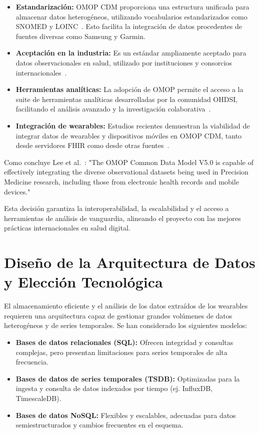 \begin{itemize}
    \item \textbf{Estandarización:} OMOP CDM proporciona una estructura unificada para almacenar datos heterogéneos, utilizando vocabularios estandarizados como SNOMED y LOINC~\cite{OHDSI}. Esto facilita la integración de datos procedentes de fuentes diversas como Samsung y Garmin.
    \item \textbf{Aceptación en la industria:} Es un estándar ampliamente aceptado para datos observacionales en salud, utilizado por instituciones y consorcios internacionales~\cite{Hripcsak2015}.
    \item \textbf{Herramientas analíticas:} La adopción de OMOP permite el acceso a la suite de herramientas analíticas desarrolladas por la comunidad OHDSI, facilitando el análisis avanzado y la investigación colaborativa~\cite{OHDSItools}.
    \item \textbf{Integración de wearables:} Estudios recientes demuestran la viabilidad de integrar datos de wearables y dispositivos móviles en OMOP CDM, tanto desde servidores FHIR como desde otras fuentes~\cite{Kodjun2022, Lee2022}.
\end{itemize}

Como concluye Lee et al.~\cite{Lee2022}: "The OMOP Common Data Model V5.0 is capable of effectively integrating the diverse observational datasets being used in Precision Medicine research, including those from electronic health records and mobile devices."

Esta decisión garantiza la interoperabilidad, la escalabilidad y el acceso a herramientas de análisis de vanguardia, alineando el proyecto con las mejores prácticas internacionales en salud digital.

\section{Diseño de la Arquitectura de Datos y Elección Tecnológica}

El almacenamiento eficiente y el análisis de los datos extraídos de los wearables requieren una arquitectura capaz de gestionar grandes volúmenes de datos heterogéneos y de series temporales. Se han considerado los siguientes modelos:

\begin{itemize}
    \item \textbf{Bases de datos relacionales (SQL):} Ofrecen integridad y consultas complejas, pero presentan limitaciones para series temporales de alta frecuencia.
    \item \textbf{Bases de datos de series temporales (TSDB):} Optimizadas para la ingesta y consulta de datos indexados por tiempo (ej. InfluxDB, TimescaleDB).
    \item \textbf{Bases de datos NoSQL:} Flexibles y escalables, adecuadas para datos semiestructurados y cambios frecuentes en el esquema.
\end{itemize}

